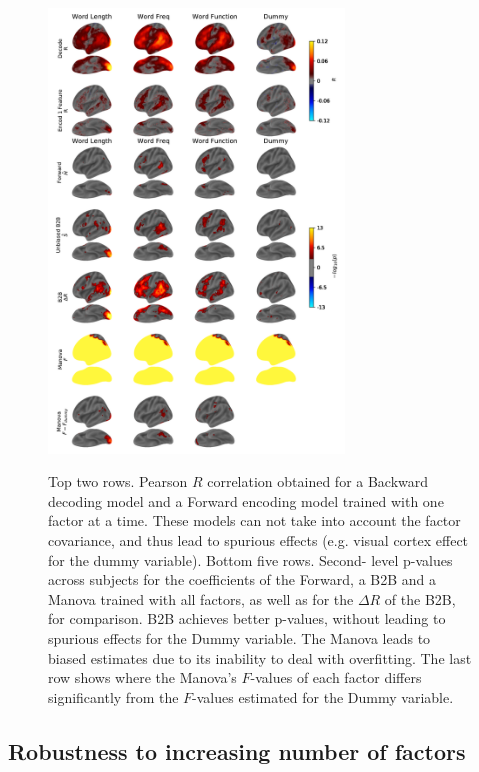 \begin{figure}
  \begin{center}
    \includegraphics[width=0.7\textwidth,
                     trim=0cm 0cm 0cm 0cm,
                     clip=True]{figures/fmri_controls.pdf}

    \label{fig:fmri_supp}
  \end{center}
  \caption{Top two rows. Pearson $R$ correlation obtained for a Backward decoding model and
  a Forward encoding model trained with one factor at a time. These models can
  not take into account the factor covariance, and thus lead to spurious effects
  (e.g. visual cortex effect for the dummy variable). Bottom five rows. Second-
  level p-values across subjects for the coefficients of the Forward, a B2B and a Manova trained with
  all factors, as well as for the $\Delta R$ of the B2B, for comparison.
  B2B achieves better p-values, without leading to spurious effects for
  the Dummy variable. The Manova leads to biased estimates due to its inability
  to deal with overfitting. The last row shows where the Manova's $F$-values of each factor differs
  significantly from the $F$-values estimated for the Dummy variable.}
\end{figure}

\subsection{Robustness to increasing number of factors}

